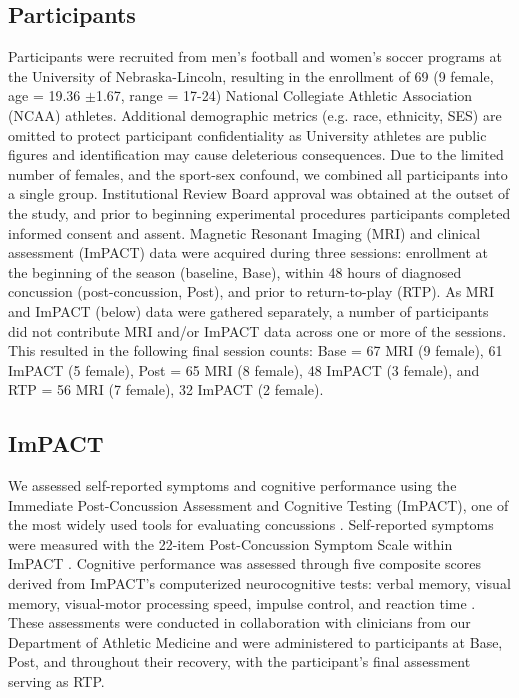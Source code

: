 \documentclass[12pt]{article}
\begin{document}
\subsection{Participants}
\label{ssec:meth-part}
Participants were recruited from men's football and women's soccer programs at the University of Nebraska-Lincoln, resulting in the enrollment of 69 (9 female, age = 19.36 $\pm$1.67, range = 17-24) National Collegiate Athletic Association (NCAA) athletes. Additional demographic metrics (e.g. race, ethnicity, SES) are omitted to protect participant confidentiality as University athletes are public figures and identification may cause deleterious consequences. Due to the limited number of females, and the sport-sex confound, we combined all participants into a single group. Institutional Review Board approval was obtained at the outset of the study, and prior to beginning experimental procedures participants completed informed consent and assent. Magnetic Resonant Imaging (MRI) and clinical assessment (ImPACT) data were acquired during three sessions: enrollment at the beginning of the season (baseline, Base), within 48 hours of diagnosed concussion (post-concussion, Post), and prior to return-to-play (RTP). As MRI and ImPACT (below) data were gathered separately, a number of participants did not contribute MRI and/or ImPACT data across one or more of the sessions. This resulted in the following final session counts: Base = 67 MRI (9 female), 61 ImPACT (5 female), Post = 65 MRI (8 female), 48 ImPACT (3 female), and RTP = 56 MRI (7 female), 32 ImPACT (2 female).


\subsection{ImPACT}
\label{ssec:meth-imp}
We assessed self-reported symptoms and cognitive performance using the Immediate Post-Concussion Assessment and Cognitive Testing (ImPACT), one of the most widely used tools for evaluating concussions \parencite{lovell2005ImPACT200540,dessy2017ReviewAssessmentScales}. Self-reported symptoms were measured with the 22-item Post-Concussion Symptom Scale within ImPACT \parencite{lovell2006MeasurementSymptomsFollowing}. Cognitive performance was assessed through five composite scores derived from ImPACT's computerized neurocognitive tests: verbal memory, visual memory, visual-motor processing speed, impulse control, and reaction time \parencite{lovell2005ImPACT200540}. These assessments were conducted in collaboration with clinicians from our Department of Athletic Medicine and were administered to participants at Base, Post, and throughout their recovery, with the participant's final assessment serving as RTP.
\end{document}

